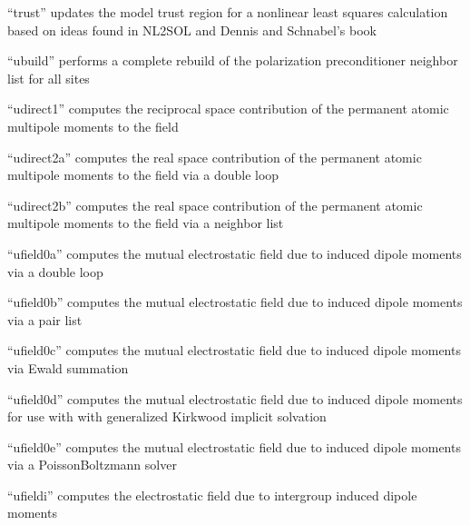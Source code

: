 \documentclass[letterpaper,11pt,english]{sphinxmanual}
\begin{document}

“trust” updates the model trust region for a nonlinear least
squares calculation based on ideas found in NL2SOL and Dennis
and Schnabel’s book


“ubuild” performs a complete rebuild of the polarization
preconditioner neighbor list for all sites


“udirect1” computes the reciprocal space contribution of the
permanent atomic multipole moments to the field


“udirect2a” computes the real space contribution of the permanent
atomic multipole moments to the field via a double loop


“udirect2b” computes the real space contribution of the permanent
atomic multipole moments to the field via a neighbor list


“ufield0a” computes the mutual electrostatic field due to
induced dipole moments via a double loop


“ufield0b” computes the mutual electrostatic field due to
induced dipole moments via a pair list


“ufield0c” computes the mutual electrostatic field due to
induced dipole moments via Ewald summation


“ufield0d” computes the mutual electrostatic field due to
induced dipole moments for use with with generalized Kirkwood
implicit solvation


“ufield0e” computes the mutual electrostatic field due to
induced dipole moments via a Poisson\sphinxhyphen{}Boltzmann solver


“ufieldi” computes the electrostatic field due to intergroup
induced dipole moments

\end{document}
